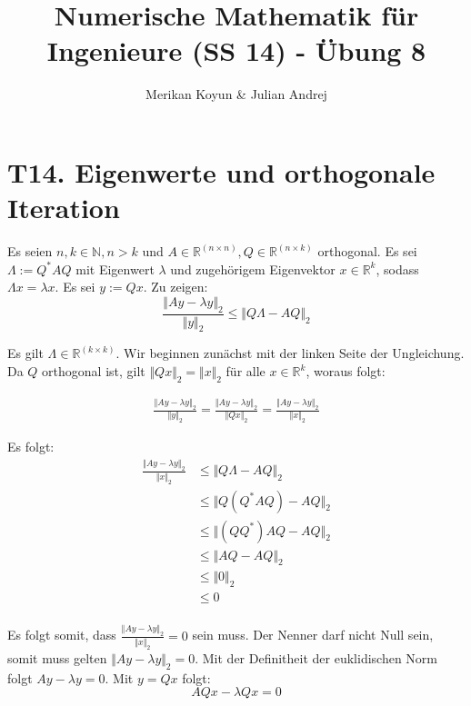 \documentclass[11pt]{article}
\theoremstyle{plain}
\theoremstyle{definition}
\renewcommand{\a}{\"{a}}
\renewcommand{\o}{\"{o}}
\renewcommand{\u}{\"{u}}
\newcommand{\nat}{\mathbb{N}}
\newcommand{\real}{\mathbb{R}}
\newcommand{\reall}[2]{\mathbb{R}^{(#1 \times #2)}}
\begin{document}
\title{Numerische Mathematik f\u r Ingenieure (SS 14) - \"{U}bung 8}
\author{Merikan Koyun \& Julian Andrej}
\maketitle

\section*{T14. Eigenwerte und orthogonale Iteration}
Es seien $n, k \in \nat, n>k$ und $A \in \reall{n}{n}, Q \in \reall{n}{k}$ orthogonal. Es sei $\Lambda := Q^*AQ$ mit Eigenwert $\lambda$ und zugeh\o rigem Eigenvektor $x \in \real^k$, sodass $\Lambda x = \lambda x$. Es sei $y:=Qx$.
Zu zeigen:
\begin{equation}
\frac{\Vert Ay-\lambda y\Vert_2}{\Vert y \Vert_2} \leq \Vert Q\Lambda - AQ \Vert_2
\end{equation}

Es gilt $\Lambda \in \reall{k}{k}$. Wir beginnen zun\a chst mit der linken Seite der Ungleichung. Da $Q$ orthogonal ist, gilt $\Vert Qx \Vert_2 = \Vert x \Vert_2$ f\u r alle $x \in \real^k$, woraus folgt:

\begin{align*}
\frac{\Vert Ay-\lambda y\Vert_2}{\Vert y \Vert_2} = \frac{\Vert Ay-\lambda y\Vert_2}{\Vert Qx \Vert_2} = \frac{\Vert Ay-\lambda y\Vert_2}{\Vert x \Vert_2}
\end{align*}

Es folgt:
\begin{align*}
\frac{\Vert Ay-\lambda y\Vert_2}{\Vert x \Vert_2} &\leq \Vert Q\Lambda - AQ \Vert_2 \\
&\leq \Vert Q (Q^*AQ)-AQ \Vert_2 \\ 
&\leq \Vert (Q Q^*)AQ-AQ \Vert_2 \\
&\leq \Vert AQ-AQ \Vert_2 \\
&\leq \Vert 0 \Vert_2 \\
&\leq 0 \\
\end{align*}

Es folgt somit, dass $\frac{\Vert Ay-\lambda y\Vert_2}{\Vert x \Vert_2} = 0$ sein muss. Der Nenner darf nicht Null sein, somit muss gelten $\Vert Ay-\lambda y\Vert_2 = 0$. Mit der Definitheit der euklidischen Norm folgt $ Ay-\lambda y = 0$. Mit $y=Qx$ folgt:
\begin{equation}
AQx-\lambda Qx=0
\end{equation}
\end{document}
